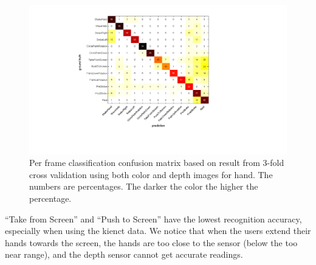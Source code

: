 \begin{figure}[tb]
\centering
\includegraphics[trim={6cm 3.5cm 10cm 1.5cm}, clip,
width=0.6\columnwidth]{figures/confusion_color_depth.png} \caption{Per frame
classification confusion matrix based on result from 3-fold cross validation using 
both color and depth images for hand. The numbers are percentages. The darker
the color the higher the percentage.}
\label{fig:confusion}
\end{figure}

``Take from Screen'' and ``Push to Screen'' have the lowest recognition
accuracy, especially when using the kienct data. We notice that when the users
extend their hands towards the screen, the hands are too close to the sensor
(below the too near range), and the depth sensor cannot get accurate readings.

